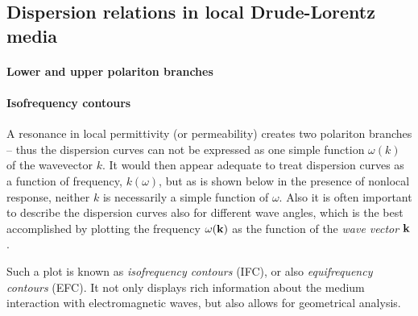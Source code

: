 \subsection{Dispersion relations in local Drude-Lorentz media} \label{disp_rel_local_media}
\paragraph{Lower and upper polariton branches}  %
\paragraph{Isofrequency contours}  %
A resonance in local permittivity (or permeability) creates two polariton branches -- thus the dispersion curves can not be expressed as one simple function $\omega(k)$ of the wavevector $k$. It would then appear adequate to treat dispersion curves as a function of frequency, $k(\omega)$, but as is shown below in the presence of nonlocal response, neither $k$ is necessarily a simple function of $\omega$. Also it is often important to describe the dispersion curves also for different wave angles, which is the best accomplished by plotting the frequency $\omega({\mathbf{k}})$ as the function of the \textit{wave vector} ${\mathbf{k}}$. 

Such a plot is known as \textit{isofrequency contours} (IFC), or also \textit{equifrequency contours} (EFC). It not only displays rich %
information about the medium interaction with electromagnetic waves, but also allows for geometrical analysis.

